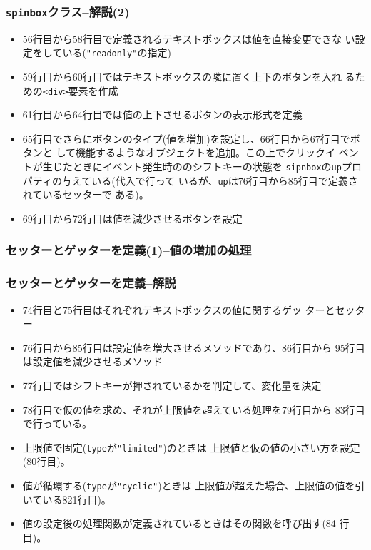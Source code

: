 \begin{frame}[containsverbatim]
  \frametitle{\texttt{spinbox}クラス--解説(2)}
\begin{itemize}
 \item 56行目から58行目で定義されるテキストボックスは値を直接変更できな
       い設定をしている(\texttt{"readonly"}の指定)
 \item 59行目から60行目ではテキストボックスの隣に置く上下のボタンを入れ
       るための\texttt{<div>}要素を作成
 \item 61行目から64行目では値の上下させるボタンの表示形式を定義
 \item 65行目でさらにボタンのタイプ(値を増加)を設定し、66行目から67行目でボタンと
       して機能するようなオブジェクトを追加。この上でクリックイ
       ベントが生じたときにイベント発生時ののシフトキーの状態を
       \texttt{sipnbox}の\texttt{up}プロパティの与えている(代入で行って
       いるが、\texttt{up}は76行目から85行目で定義されているセッターで
       ある)。
 \item 69行目から72行目は値を減少させるボタンを設定
\end{itemize}
 \end{frame}
 \begin{frame}[containsverbatim]
  \frametitle{セッターとゲッターを定義(1)--値の増加の処理}
 \end{frame}
 \begin{frame}[containsverbatim]
  \frametitle{セッターとゲッターを定義--解説}
\begin{itemize}
 \item 74行目と75行目はそれぞれテキストボックスの値に関するゲッ
       ターとセッター
 \item 76行目から85行目は設定値を増大させるメソッドであり、86行目から
       95行目は設定値を減少させるメソッド
 \item 77行目ではシフトキーが押されているかを判定して、変化量を決定
 \item 78行目で仮の値を求め、それが上限値を超えている処理を79行目から
			 83行目で行っている。
 \item
			 上限値で固定(\texttt{type}が\texttt{"limited"})のときは
       上限値と仮の値の小さい方を設定(80行目)。
\item		値が循環する(\texttt{type}が\texttt{"cyclic"})ときは
       上限値が超えた場合、上限値の値を引いている821行目)。
 \item 値の設定後の処理関数が定義されているときはその関数を呼び出す(84
       行目)。
\end{itemize}
 \end{frame}
